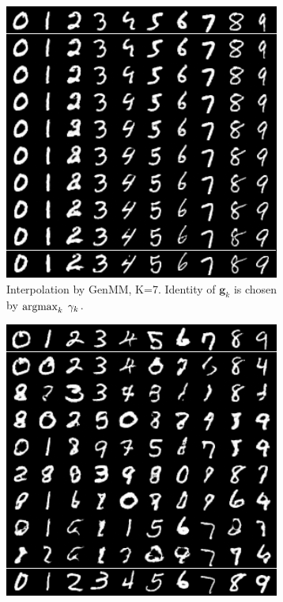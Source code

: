 \begin{figure}[!ht]
  \centering
  \captionsetup[subfigure]{justification=centering}
  \begin{subfigure}[b]{0.3\textwidth}
    \centering
    \includegraphics[width=1\linewidth]{images/mnist/interpolation/interpoMNIST_homo_GenMM_K7_map_grid.png}
    \caption{Interpolation by GenMM, K=7. Identity of $\bm{g}_k$ is chosen by $\operatorname{argmax}_{k}\; \gamma_k$.}\label{fig-interpo-genmm1}
  \end{subfigure}
  \hspace{10pt}
  \begin{subfigure}[b]{0.3\textwidth}
    \centering
    \includegraphics[width=1\linewidth]{images/mnist/interpolation/interpoMNIST_GenMM_K7_random_grid.png}

\end{subfigure}
\end{figure}
